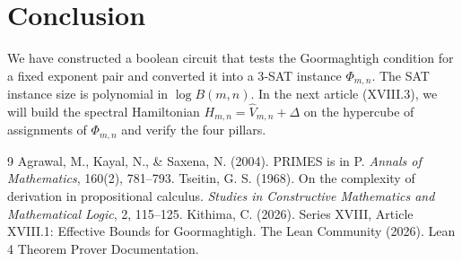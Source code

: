 \documentclass[11pt,a4paper]{article}
\begin{document}
\section{Conclusion}

We have constructed a boolean circuit that tests the Goormaghtigh condition for a fixed exponent pair and converted it into a 3‑SAT instance \(\Phi_{m,n}\). The SAT instance size is polynomial in \(\log B(m,n)\). In the next article (XVIII.3), we will build the spectral Hamiltonian \(H_{m,n} = \hat{V}_{m,n} + \Delta\) on the hypercube of assignments of \(\Phi_{m,n}\) and verify the four pillars.


\begin{thebibliography}{9}
  Agrawal, M., Kayal, N., \& Saxena, N. (2004). PRIMES is in P. \emph{Annals of Mathematics}, 160(2), 781–793.
  Tseitin, G. S. (1968). On the complexity of derivation in propositional calculus. \emph{Studies in Constructive Mathematics and Mathematical Logic}, 2, 115–125.
  Kithima, C. (2026). Series XVIII, Article XVIII.1: Effective Bounds for Goormaghtigh.
  The Lean Community (2026). Lean 4 Theorem Prover Documentation.
\end{thebibliography}
\end{document}
